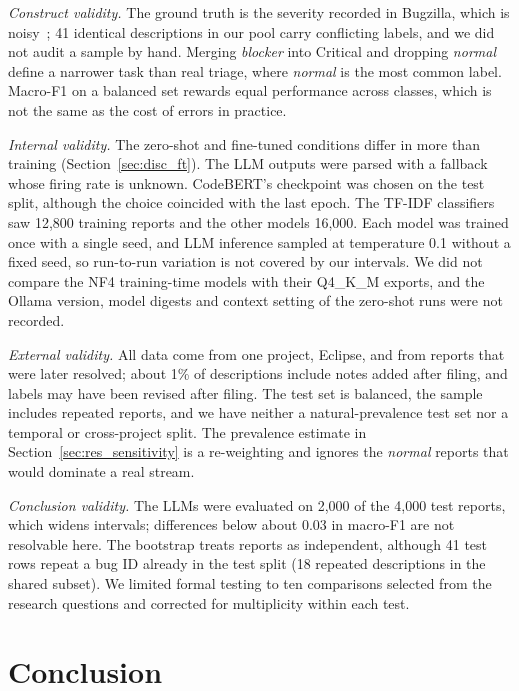 \documentclass[a4paper,fleqn]{cas-sc}
\begin{document}
\textit{Construct validity.} The ground truth is the severity recorded in Bugzilla,
which is noisy~\citep{tian2016unreliability}; 41 identical descriptions in our pool
carry conflicting labels, and we did not audit a sample by hand. Merging
\textit{blocker} into Critical and dropping \textit{normal} define a narrower task than
real triage, where \textit{normal} is the most common label. Macro-F1 on a balanced set
rewards equal performance across classes, which is not the same as the cost of errors in
practice.

\textit{Internal validity.} The zero-shot and fine-tuned conditions differ in more than
training (Section~\ref{sec:disc_ft}). The LLM outputs were parsed with a fallback whose
firing rate is unknown. CodeBERT's checkpoint was chosen on the test split, although
the choice coincided with the last epoch. The TF-IDF classifiers saw 12,800 training
reports and the other models 16,000. Each model was trained once with a single seed,
and LLM inference sampled at temperature 0.1 without a fixed seed, so run-to-run
variation is not covered by our intervals. We did not compare the NF4 training-time
models with their Q4\_K\_M exports, and the Ollama version, model digests and context
setting of the zero-shot runs were not recorded.

\textit{External validity.} All data come from one project, Eclipse, and from reports
that were later resolved; about 1\% of descriptions include notes added after filing,
and labels may have been revised after filing. The test set is balanced, the
sample includes repeated reports, and we have neither a natural-prevalence test set nor
a temporal or cross-project split. The prevalence estimate in
Section~\ref{sec:res_sensitivity} is a re-weighting and ignores the \textit{normal}
reports that would dominate a real stream.

\textit{Conclusion validity.} The LLMs were evaluated on 2,000 of the 4,000 test
reports, which widens intervals; differences below about 0.03 in macro-F1 are not
resolvable here. The bootstrap treats reports as independent, although 41 test rows
repeat a bug ID already in the test split (18 repeated descriptions in the shared
subset). We limited formal testing to ten comparisons selected from the research
questions and corrected for multiplicity within each test.

\section{Conclusion}
\label{sec:conclusion}
\end{document}

